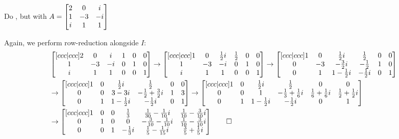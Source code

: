 \documentclass[notes]{agony}
\begin{document}
\begin{xca}
  Do , but with $A = \mqty[2&0&i \\ 1&-3&-i \\ i&1&1]$
\end{xca}
\begin{sol}
  Again, we perform row-reduction alongside $I$:
  \begin{equation*}
    \begin{split}
      & \bmqty[ccc|ccc]{2&0&i & 1&0&0 \\ 1&-3&-i & 0&1&0 \\ i&1&1 & 0&0&1}
      \to \bmqty[ccc|ccc]{1&0&\frac12i & \frac12&0&0 \\ 1&-3&-i & 0&1&0 \\ i&1&1 & 0&0&1}
      \to \bmqty[ccc|ccc]{1&0&\frac12i & \frac12&0&0 \\ 0&-3&-\frac32i & -\frac12&1&0 \\ 0&1&1-\frac12i & -\frac12i&0&1} \\
      & \to \bmqty[ccc|ccc]{1&0&\frac12i & \frac12&0&0 \\ 0&0&3-3i & -\frac12+\frac32i&1&3 \\ 0&1&1-\frac12i & -\frac12i&0&1}
      \to \bmqty[ccc|ccc]{1&0&\frac12i & \frac12&0&0 \\ 0&0&1 & -\frac13+\frac16i&\frac16+\frac16i&\frac12+\frac12i \\ 0&1&1-\frac12i & -\frac12i&0&1} \\
      & \to \bmqty[ccc|ccc]{
        1&0&0 & \frac13&\frac1{30}-\frac1{10}i&\frac1{10}-\frac3{10}i \\
        0&1&0 & 0&-\frac3{10}-\frac1{10}i&\frac1{10}-\frac3{10}i \\
        0&0&1 & -\frac13i&\frac15-\frac1{15}i&\frac35+\frac15i
      } \qedhere
    \end{split}
  \end{equation*}
\end{sol}
\end{document}
